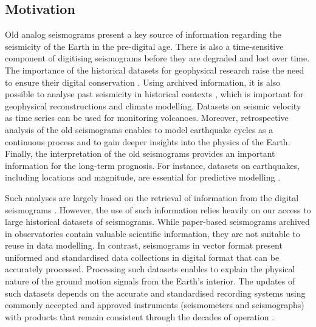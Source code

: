 \documentclass[sensors,article,accept,moreauthors,pdftex]{Definitions/mdpi}
\begin{document}
\subsection{Motivation}
Old analog seismograms present a key source of information regarding the seismicity of the Earth in the pre-digital age.{ }There is also a time{-}sensitive component of digitising {seismograms} before they are degraded and lost over time. The importance of the historical datasets for geophysical research{ raise the need to ensure their digital \linebreak conservation }\cite{Vogtetal1985, TevesCosta1999,Bono2007,Okal}. Using archived information{, }it is also possible to analyse past seismicity {in }historical{ contexts } \cite{Alexandre1990a,Alexandre1985,Alexandre1990b}, which {is important }for geophysical reconstructions and climate modelling. {Datasets on }seismic velocity as time series{ }can be used for monitoring volcanoes. Moreover, retrospective analysis of the old seismograms enables to model earthquake cycles{ }as a continuous process and to {gain deeper }insights into the physics of the {Earth}. Finally, {the }interpretation of {the }old seismograms provides {an important }information for the long-term prognosis{. For instance, datasets on earthquakes, including locations and magnitude, are essential for }predictive modelling \cite{Kanamori1988}.

Such analyses are largely based on the retrieval of information from {the }digital seismograms \cite{Claerbout1992}. However, the use of such information relies heavily on our access to large {historical }datasets of seismograms. {While paper-based seismograms archived in observatories contain valuable scientific information, they are not suitable to reuse in data modelling. In contrast, seismograms in vector format present }uniformed {and }standardised {data collections in digital format that can be} accurately processed{. Processing such datasets enables} to explain the physical nature of the ground motion signals {from the Earth's interior}. 
The {updates} of such datasets depends on {the }accurate and standardised recording systems using commonly accepted and approved instruments (seismometers and seismographs) with products that remain consistent through {the }decades of operation \cite{UdiasBuforn2017}. 
\end{document}
